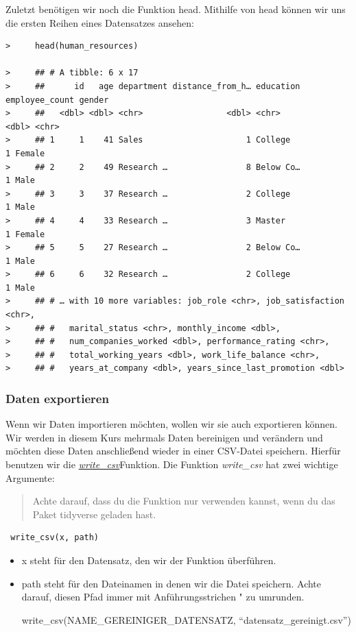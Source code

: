\documentclass[
]{book}
\begin{document}
Zuletzt benötigen wir noch die Funktion head. Mithilfe von head können wir uns die ersten Reihen eines Datensatzes ansehen:

\begin{verbatim}
>     head(human_resources)

>     ## # A tibble: 6 x 17
>     ##      id   age department distance_from_h… education employee_count gender
>     ##   <dbl> <dbl> <chr>                 <dbl> <chr>              <dbl> <chr> 
>     ## 1     1    41 Sales                     1 College                1 Female
>     ## 2     2    49 Research …                8 Below Co…              1 Male  
>     ## 3     3    37 Research …                2 College                1 Male  
>     ## 4     4    33 Research …                3 Master                 1 Female
>     ## 5     5    27 Research …                2 Below Co…              1 Male  
>     ## 6     6    32 Research …                2 College                1 Male  
>     ## # … with 10 more variables: job_role <chr>, job_satisfaction <chr>,
>     ## #   marital_status <chr>, monthly_income <dbl>,
>     ## #   num_companies_worked <dbl>, performance_rating <chr>,
>     ## #   total_working_years <dbl>, work_life_balance <chr>,
>     ## #   years_at_company <dbl>, years_since_last_promotion <dbl>
\end{verbatim}

\hypertarget{daten-exportieren}{%
\subsubsection{Daten exportieren}\label{daten-exportieren}}

Wenn wir Daten importieren möchten, wollen wir sie auch exportieren können. Wir werden in diesem Kurs mehrmals Daten bereinigen und verändern und möchten diese Daten anschließend wieder in einer CSV-Datei speichern. Hierfür benutzen wir die \href{https://readr.tidyverse.org/reference/write_delim.html}{\emph{write\_csv}}Funktion. Die Funktion \emph{write\_csv} hat zwei wichtige Argumente:

\begin{quote}
Achte darauf, dass du die Funktion nur verwenden kannst, wenn du das Paket tidyverse geladen hast.
\end{quote}

\begin{verbatim}
 write_csv(x, path)
\end{verbatim}

\begin{itemize}
\item
  x steht für den Datensatz, den wir der Funktion überführen.
\item
  path steht für den Dateinamen in denen wir die Datei speichern. Achte darauf, diesen Pfad immer mit Anführungsstrichen " zu umrunden.

  write\_csv(NAME\_GEREINIGER\_DATENSATZ, ``datensatz\_gereinigt.csv'')
\end{itemize}
\end{document}
